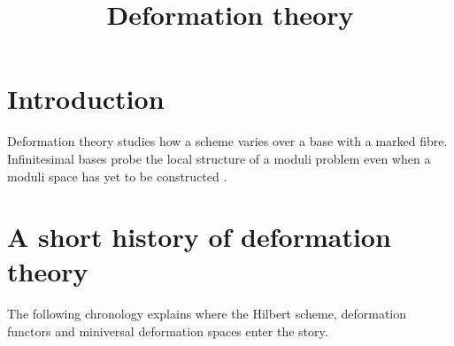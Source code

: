 



\title{Deformation theory}
\maketitle

\label{section-phantom}

\tableofcontents

\section{Introduction}
\label{section-intro}

\noindent
Deformation theory studies how a scheme
varies over a base with a marked fibre.
Infinitesimal bases probe the local
structure of a moduli problem even when
a moduli space has yet to be constructed
\cite{Sernesi-deformations}.

\section{A short history of deformation theory}
\label{section-history-deformation-theory}

\noindent
The following chronology explains where the
Hilbert scheme, deformation functors and
miniversal deformation spaces enter the
story.

